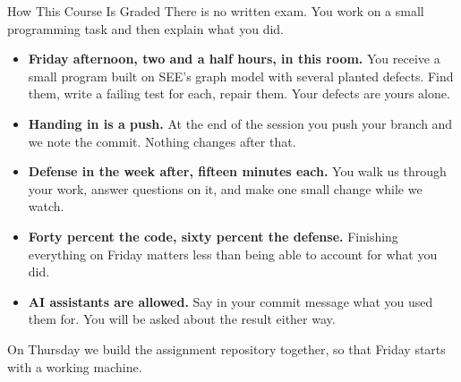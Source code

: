 \begin{frame}{How This Course Is Graded}
  There is no written exam. You work on a small programming task and then
  explain what you did.
  \begin{itemize}
    \item \textbf{Friday afternoon, two and a half hours, in this room.} You
      receive a small program built on SEE's graph model with several planted
      defects. Find them, write a failing test for each, repair them. Your
      defects are yours alone.
    \item \textbf{Handing in is a push.} At the end of the session you push
      your branch and we note the commit. Nothing changes after that.
    \item \textbf{Defense in the week after, fifteen minutes each.} You walk us
      through your work, answer questions on it, and make one small change
      while we watch.
    \item \textbf{Forty percent the code, sixty percent the defense.} Finishing
      everything on Friday matters less than being able to account for what you
      did.
    \item \textbf{AI assistants are allowed.} Say in your commit message what
      you used them for. You will be asked about the result either way.
  \end{itemize}
  \vspace{1ex}

  On Thursday we build the assignment repository together, so that Friday
  starts with a working machine.
\end{frame}


